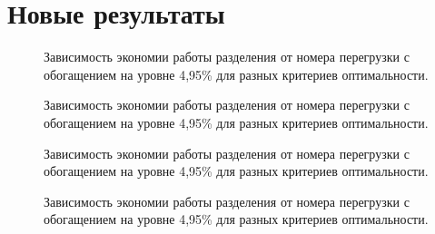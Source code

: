 \chapter{Новые результаты}




\begin{figure}

\caption{{Зависимость экономии работы разделения от номера перегрузки с обогащением на уровне 4,95\% для разных критериев оптимальности.{\label{loop_sw}}}}
\end{figure}


\begin{figure}
    
    \caption{{Зависимость экономии работы разделения от номера перегрузки с обогащением на уровне 4,95\% для разных критериев оптимальности.{\label{loop_ex}}}}
\end{figure}

\begin{figure}
    
    \caption{{Зависимость экономии работы разделения от номера перегрузки с обогащением на уровне 4,95\% для разных критериев оптимальности.{\label{loop_exR}}}}
\end{figure}
    
    
\begin{figure}
    
    \caption{{Зависимость экономии работы разделения от номера перегрузки с обогащением на уровне 4,95\% для разных критериев оптимальности.{\label{loop_pFo}}}}
\end{figure}






